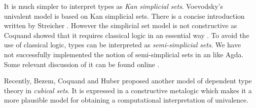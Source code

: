It is much simpler to interpret types as \emph{Kan simplicial sets}.
Voevodsky's univalent model \cite{klv:ssetmodel} is based on Kan simplicial sets. 
There is a concise introduction written by Streicher \cite{DBLP:dblp_journals/japll/Streicher14}. 
However the simplicial set model is not constructive as Coquand showed
that it requires classical logic in an essential way \cite{TC:sset}.
To avoid the use of classical logic, types can be interpreted as \emph{semi-simplicial sets}. We have not successfully implemented the notion of semi-simplicial sets in an \itt like Agda. Some relevant discussion of it can be found online \cite{ssSet}.

Recently, Bezem, Coquand and Huber \cite{bezem2013model} proposed another model of dependent type theory 
in \emph{cubical sets}. It is expressed in a constructive metalogic which makes it a more plausible model for obtaining a computational interpretation of univalence.








